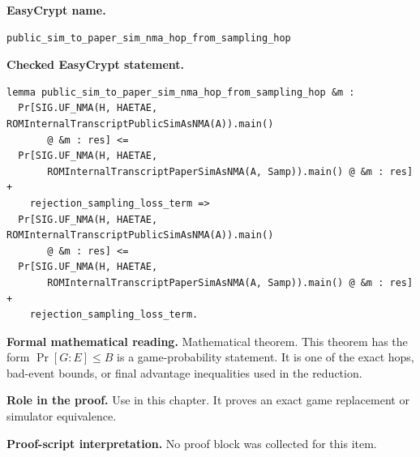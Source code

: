 \begin{formaltheorem}
\noindent\textbf{EasyCrypt name.}
\begin{lstlisting}[language=EasyCrypt,basicstyle=\ttfamily\scriptsize]
public_sim_to_paper_sim_nma_hop_from_sampling_hop
\end{lstlisting}
\noindent\textbf{Checked EasyCrypt statement.}
\begin{lstlisting}[language=EasyCrypt,basicstyle=\ttfamily\scriptsize]
lemma public_sim_to_paper_sim_nma_hop_from_sampling_hop &m :
  Pr[SIG.UF_NMA(H, HAETAE, ROMInternalTranscriptPublicSimAsNMA(A)).main()
       @ &m : res] <=
  Pr[SIG.UF_NMA(H, HAETAE,
       ROMInternalTranscriptPaperSimAsNMA(A, Samp)).main() @ &m : res] +
    rejection_sampling_loss_term =>
  Pr[SIG.UF_NMA(H, HAETAE, ROMInternalTranscriptPublicSimAsNMA(A)).main()
       @ &m : res] <=
  Pr[SIG.UF_NMA(H, HAETAE,
       ROMInternalTranscriptPaperSimAsNMA(A, Samp)).main() @ &m : res] +
    rejection_sampling_loss_term.
\end{lstlisting}
\noindent\textbf{Formal mathematical reading.}
Mathematical theorem. This theorem has the form \(\Pr[G:E] \le B\) is a game-probability statement.  It is one of the exact hops, bad-event bounds, or final advantage inequalities used in the reduction.

\noindent\textbf{Role in the proof.}
Use in this chapter. It proves an exact game replacement or simulator equivalence.

\noindent\textbf{Proof-script interpretation.}
No proof block was collected for this item.

\end{formaltheorem}

